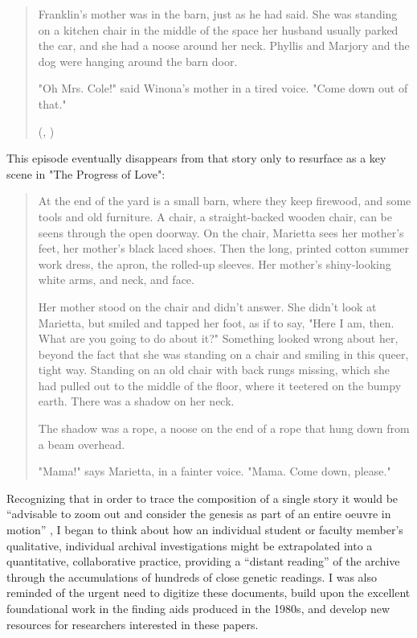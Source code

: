 \documentclass{article}
\begin{document}
\begin{quote}
Franklin's mother was in the barn, just as he had said. She was standing on a kitchen chair in the middle of the space her husband usually parked the car, and she had a noose around her neck. Phyllis and Marjory and the dog were hanging around the barn door. 

"Oh Mrs. Cole!" said Winona's mother in a tired voice. "Come down out of that."
\begin{flushright}
    (\cite[197]{munro_alice_nodate}, )    
\end{flushright}    
\end{quote}

\noindent This episode eventually disappears from that story only to resurface as a key scene in "The Progress of Love":

\begin{quote}
At the end of the yard is a small barn, where they keep firewood, and some tools and old furniture. A chair, a straight-backed wooden chair, can be seens through the open doorway. On the chair, Marietta sees her mother's feet, her mother's black laced shoes. Then the long, printed cotton summer work dress, the apron, the rolled-up sleeves. Her mother's shiny-looking white arms, and neck, and face.

Her mother stood on the chair and didn't answer. She didn't look at Marietta, but smiled and tapped her foot, as if to say, "Here I am, then. What are you going to do about it?" Something looked wrong about her, beyond the fact that she was standing on a chair and smiling in this queer, tight way. Standing on an old chair with back rungs missing, which she had pulled out to the middle of the floor, where it teetered on the bumpy earth. There was a shadow on her neck.

The shadow was a rope, a noose on the end of a rope that hung down from a beam overhead.

"Mama!" says Marietta, in a fainter voice. "Mama. Come down, please."
\begin{flushright}
    \parencite[10]{munro_progress_1986}
\end{flushright}
\end{quote}

Recognizing that in order to trace
the composition of a single story it would be ``advisable to zoom out
and consider the genesis as part of an entire oeuvre in motion'' \citep[60]{van_hulle_genetic_2022}, I began to think about how an individual student or faculty
member's qualitative, individual archival investigations might be
extrapolated into a quantitative, collaborative practice, providing a
``distant reading'' of the archive through the accumulations of hundreds
of close genetic readings. I was also reminded of the urgent need to
digitize these documents, build upon the excellent foundational work in
the finding aids produced in the 1980s, and develop new resources for
researchers interested in these papers.
\end{document}
